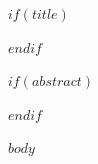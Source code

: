 \documentclass[$if(fontsize)$$fontsize$,$endif$$for(classoption)$$classoption$$sep$,$endfor$]{$documentclass$}
\author{$for(author)$$author$$sep$ \and $endfor$}
\date{$date$}
\begin{document}
$if(title)$\maketitle$endif$

$if(abstract)$
\begin{abstract}
$abstract$
\end{abstract}
$endif$

$body$
\end{document}
